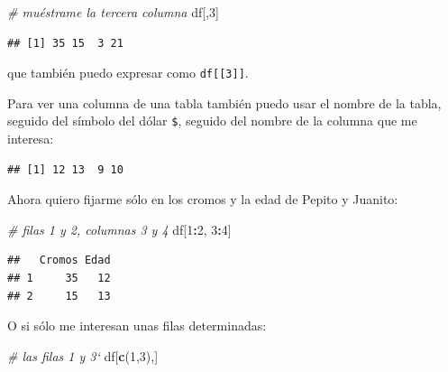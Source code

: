 \documentclass[]{book}
\newenvironment{Shaded}{\begin{snugshade}}{\end{snugshade}}
\newcommand{\CommentTok}[1]{\textcolor[rgb]{0.56,0.35,0.01}{\textit{#1}}}
\newcommand{\DecValTok}[1]{\textcolor[rgb]{0.00,0.00,0.81}{#1}}
\newcommand{\KeywordTok}[1]{\textcolor[rgb]{0.13,0.29,0.53}{\textbf{#1}}}
\newcommand{\NormalTok}[1]{#1}
\newcommand{\OperatorTok}[1]{\textcolor[rgb]{0.81,0.36,0.00}{\textbf{#1}}}
\theoremstyle{definition}
\theoremstyle{definition}
\theoremstyle{definition}
\theoremstyle{remark}
\begin{document}
\begin{Shaded}
\begin{Highlighting}[]
\CommentTok{# muéstrame la tercera columna}
\NormalTok{df[,}\DecValTok{3}\NormalTok{] }
\end{Highlighting}
\end{Shaded}

\begin{verbatim}
## [1] 35 15  3 21
\end{verbatim}

que también puedo expresar como \texttt{df{[}{[}3{]}{]}}.

Para ver una columna de una tabla también puedo usar el nombre de la
tabla, seguido del símbolo del dólar \texttt{\$}, seguido del nombre de
la columna que me interesa:

\begin{Shaded}
\end{Shaded}

\begin{verbatim}
## [1] 12 13  9 10
\end{verbatim}

Ahora quiero fijarme sólo en los cromos y la edad de Pepito y Juanito:

\begin{Shaded}
\begin{Highlighting}[]
\CommentTok{# filas 1 y 2, columnas 3 y 4}
\NormalTok{df[}\DecValTok{1}\OperatorTok{:}\DecValTok{2}\NormalTok{, }\DecValTok{3}\OperatorTok{:}\DecValTok{4}\NormalTok{] }
\end{Highlighting}
\end{Shaded}

\begin{verbatim}
##   Cromos Edad
## 1     35   12
## 2     15   13
\end{verbatim}

O si sólo me interesan unas filas determinadas:

\begin{Shaded}
\begin{Highlighting}[]
\CommentTok{# las filas 1 y 3`}
\NormalTok{df[}\KeywordTok{c}\NormalTok{(}\DecValTok{1}\NormalTok{,}\DecValTok{3}\NormalTok{),] }
\end{Highlighting}
\end{Shaded}
\end{document}
